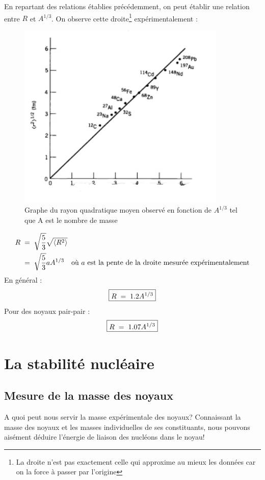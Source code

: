 En repartant des relations établies précédemment, on peut établir une relation entre $R$ et $A^{1/3}$. On observe cette droite\footnote{La droite n'est pas exactement celle qui approxime au mieux les données car on la force à passer par l'origine} expérimentalement :
\begin{figure}[H]
    \centering
    \includegraphics[scale=1.2]{Images4/DroiteAR.PNG}
    \caption{Graphe du rayon quadratique moyen observé en fonction de $A^{1/3}$ tel que A est le nombre de masse}
\end{figure}
\begin{align*}
    R &\; = \; \sqrt{\dfrac{5}{3}} \sqrt{\expval{R^2}}\\
    &\; = \; \sqrt{\dfrac{5}{3}} aA^{1/3} \quad \text{où $a$ est la pente de la droite mesurée expérimentalement}
\end{align*}
En général :
\[
    \boxed{
        R \; = \; 1.2 A^{1/3}
    }
\]
Pour des noyaux pair-pair :
\[
    \boxed{
        R \; = \; 1.07 A^{1/3}
    }
\]








\section{La stabilité nucléaire}

\subsection{Mesure de la masse des noyaux}

A quoi peut nous servir la masse expérimentale des noyaux? Connaissant la masse des noyaux et les masses individuelles de ses constituants, nous pouvons aisément déduire l'énergie de liaison des nucléons dans le noyau!

